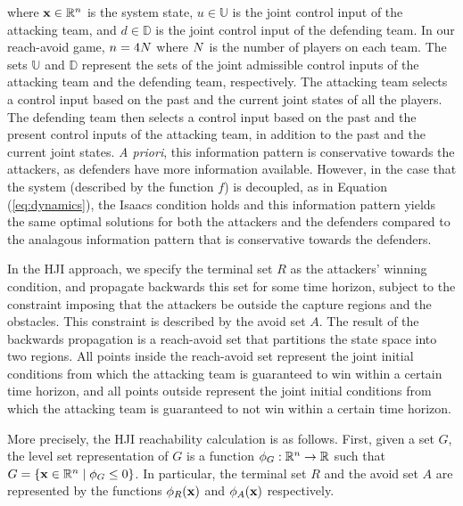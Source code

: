 \noindent where $\mathbf{x}\in\mathbb{R}^n$ is the system state, $u\in\mathbb{U}$ is the joint control input of the attacking team, and $d\in\mathbb{D}$ is the joint control input of the defending team. In our reach-avoid game, $n=4N$ where $N$ is the number of players on each team. The sets $\mathbb{U}$ and $\mathbb{D}$ represent the sets of the joint admissible control inputs of the attacking team and the defending team, respectively. The attacking team selects a control input based on the past and the current joint states of all the players. The defending team then selects a control input based on the past and the present control inputs of the attacking team, in addition to the past and the current joint states. \textit{A priori}, this information pattern is conservative towards the attackers, as defenders have more information available. However, in the case that the system (described by the function $f$) is decoupled, as in Equation (\ref{eq:dynamics}), the Isaacs condition \cite{b:isaacs-1967} holds and this information pattern yields the same optimal solutions for both the attackers and the defenders compared to the analagous information pattern that is conservative towards the defenders.

In the HJI approach, we specify the terminal set $R$ as the attackers' winning condition, and propagate backwards this set for some time horizon, subject to the constraint imposing that the attackers be outside the capture regions and the obstacles. This constraint is described by the avoid set $A$. The result of the backwards propagation is a reach-avoid set that partitions the state space into two regions. All points inside the reach-avoid set represent the joint initial conditions from which the attacking team is guaranteed to win within a certain time horizon, and all points outside represent the joint initial conditions from which the attacking team is guaranteed to not win within a certain time horizon.

More precisely, the HJI reachability calculation is as follows. First, given a set $G$, the level set representation of $G$ is a function $\phi_G:\mathbb{R}^n \rightarrow \mathbb{R}$ such that $G = \left\{\mathbf{x}\in\mathbb{R}^n \mid \phi_G\le0\right\}$. In particular, the terminal set $R$ and the avoid set $A$ are represented by the functions $\phi_R(\mathbf{x})$ and $\phi_A(\mathbf{x})$ respectively.
 
